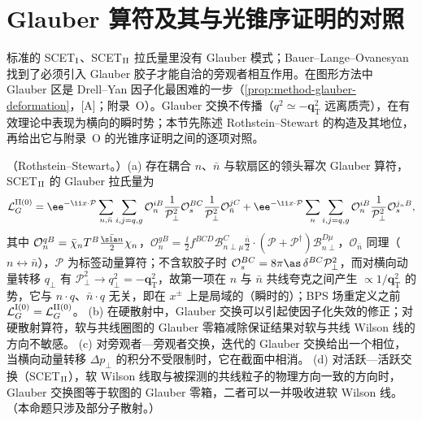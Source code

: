 \section{Glauber 算符及其与光锥序证明的对照}\label{sec:scet-glauber}

标准的 SCET$_{\rm I}$、SCET$_{\rm II}$ 拉氏量里没有 Glauber 模式；Bauer--Lange--Ovanesyan 找到了必须引入 Glauber 胶子才能自洽的旁观者相互作用\cite{Bauer:2010cc}。在图形方法中 Glauber 区是 Drell--Yan 因子化最困难的一步（\cref{prop:method-glauber-deformation}，[A]；附录~O）。Glauber 交换不传播（$q^2\simeq-\bm q_{\mathrm T}^2$ 远离质壳），在有效理论中表现为横向的瞬时势；本节先陈述 Rothstein--Stewart 的构造及其地位，再给出它与附录~O 的光锥序证明之间的逐项对照。

\begin{proposition}\label{prop:scet-glauber-operators}
（Rothstein--Stewart\cite{RothsteinStewart2016}。）(a) 存在耦合 $n$、$\bar n$ 与软扇区的领头幂次 Glauber 算符，SCET$_{\rm II}$ 的 Glauber 拉氏量为\cite[式~(5.21)]{RothsteinStewart2016}
\begin{equation}\label{eq:scet-LG}
\mathcal L_G^{\rm II(0)}=\ee^{-\ii x\cdot\mathcal P}\sum_{n,\bar n}\sum_{i,j=q,g}\mathcal O_n^{iB}\frac{1}{\mathcal P_\perp^2}\mathcal O_s^{BC}\frac{1}{\mathcal P_\perp^2}\mathcal O_{\bar n}^{jC}
+\ee^{-\ii x\cdot\mathcal P}\sum_n\sum_{i,j=q,g}\mathcal O_n^{iB}\frac{1}{\mathcal P_\perp^2}\mathcal O_s^{j_nB},
\end{equation}
其中 $\mathcal O_n^{qB}=\bar\chi_nT^B\frac{\bar{\sla n}}{2}\chi_n$，$\mathcal O_n^{gB}=\frac\ii2f^{BCD}\mathcal B^C_{n\perp\mu}\frac{\bar n}{2}\cdot(\mathcal P+\mathcal P^\dagger)\mathcal B^{D\mu}_{n\perp}$，$\mathcal O_{\bar n}$ 同理（$n\leftrightarrow\bar n$），$\mathcal P$ 为标签动量算符；不含软胶子时 $\mathcal O_s^{BC}=8\pi\as\,\delta^{BC}\mathcal P_\perp^2$，而对横向动量转移 $q_\perp$ 有 $\mathcal P_\perp^2\to q_\perp^2=-\bm q_{\mathrm T}^2$，故第一项在 $n$ 与 $\bar n$ 共线夸克之间产生 $\propto1/\bm q_{\mathrm T}^2$ 的势，它与 $n\cdot q$、$\bar n\cdot q$ 无关，即在 $x^\pm$ 上是局域的（瞬时的）；BPS 场重定义之前 $\mathcal L_G^{\rm I(0)}=\mathcal L_G^{\rm II(0)}$。
(b) 在硬散射中，Glauber 交换可以引起使因子化失效的修正；对硬散射算符，软与共线圈图的 Glauber 零箱减除保证结果对软与共线 Wilson 线的方向不敏感\cite[摘要]{RothsteinStewart2016}。
(c) 对旁观者—旁观者交换，迭代的 Glauber 交换给出一个相位，当横向动量转移 $\Delta p_\perp$ 的积分不受限制时，它在截面中相消。
(d) 对活跃—活跃交换（SCET$_{\rm II}$），软 Wilson 线取与被探测的共线粒子的物理方向一致的方向时，Glauber 交换图等于软图的 Glauber 零箱，二者可以一并吸收进软 Wilson 线\cite[第~10、10.1~节]{RothsteinStewart2016}。
（本命题只涉及部分子散射。）
\end{proposition}

